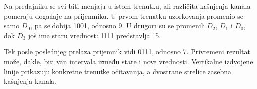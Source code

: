 Na predajniku se svi biti menjaju u istom trenutku, ali različita kašnjenja kanala pomeraju događaje na prijemniku. U prvom trenutku uzorkovanja promenio se samo $D_0$, pa se dobija 1001, odnosno 9. U drugom su se promenili $D_2$, $D_1$ i $D_0$, dok $D_3$ još ima staru vrednost: 1111 predstavlja 15.

Tek posle poslednjeg prelaza prijemnik vidi 0111, odnosno 7. Privremeni rezultat može, dakle, biti van intervala između stare i nove vrednosti. Vertikalne izdvojene linije prikazuju konkretne trenutke očitavanja, a dvostrane strelice zasebna kašnjenja kanala.

